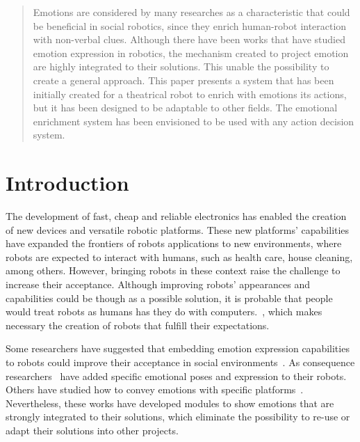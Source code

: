 \documentclass{sig-alternate-05-2015}
\begin{document}
\maketitle
\begin{abstract}
Emotions are considered by many researches as a characteristic that could be beneficial in social robotics, since they enrich human-robot interaction with non-verbal clues. Although there have been works that have studied emotion expression in robotics, the mechanism created to project emotion are highly integrated to their solutions. This unable the possibility to create a general approach. 
This paper presents a system that has been initially created for a theatrical robot to enrich with emotions its actions, but it has been designed to be adaptable to other fields. The emotional enrichment system has been envisioned to be used with any action decision system. 
\end{abstract}

\printccsdesc



\section{Introduction}
The development of fast, cheap and reliable electronics has enabled the creation of new devices and versatile robotic platforms. These new platforms' capabilities have expanded the frontiers of robots applications  to new environments, where robots are expected to interact with humans, such as health care, house cleaning, among others. However, bringing robots in these context raise the challenge to increase their acceptance. Although improving robots' appearances and capabilities could be though as a possible solution, it is probable that people would treat robots as humans has they do with computers.~\cite{Reeves1996}, which makes necessary the creation of robots that fulfill their expectations.

Some researchers have suggested that embedding emotion expression capabilities to robots could improve their acceptance in social environments~\cite{Pavia2014}. As consequence researchers~\cite{Breazeal2002} have added specific emotional poses and expression to their robots. Others have studied how to convey emotions with specific platforms~\cite{Li2011,Brown2014}. Nevertheless, these works have developed modules to show emotions that are strongly integrated to their solutions, which eliminate the possibility to re-use or adapt their solutions into other projects. 
 
\end{document}
